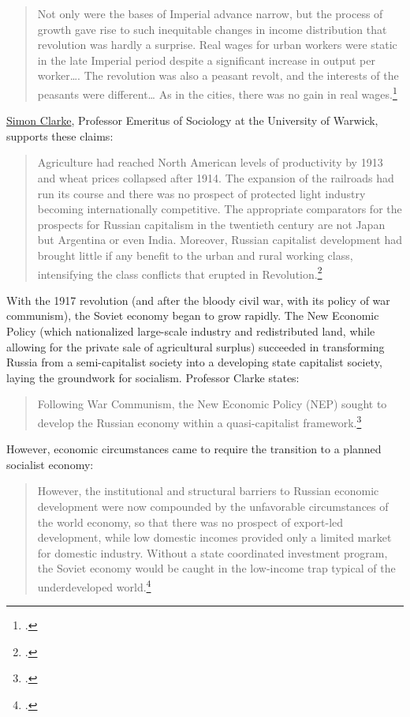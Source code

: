 \begin{quote}
Not only were the bases of Imperial advance narrow, but the process of
growth gave rise to such inequitable changes in income distribution that
revolution was hardly a surprise. Real wages for urban workers were
static in the late Imperial period despite a significant increase in
output per worker\ldots. The revolution was also a peasant revolt, and
the interests of the peasants were different\ldots{} As in the cities,
  there was no gain in real wages.\footcite{allen2003farm}
\end{quote}

\href{https://homepages.warwick.ac.uk/~syrbe/}{Simon Clarke}, Professor
Emeritus of Sociology at the University of Warwick, supports these
claims:

\begin{quote}
Agriculture had reached North American levels of productivity by 1913
and wheat prices collapsed after 1914. The expansion of the railroads
had run its course and there was no prospect of protected light industry
becoming internationally competitive. The appropriate comparators for
the prospects for Russian capitalism in the twentieth century are not
Japan but Argentina or even India. Moreover, Russian capitalist
development had brought little if any benefit to the urban and rural
working class, intensifying the class conflicts that erupted in
  Revolution.\footcite{clarke2005farm}
\end{quote}

With the 1917 revolution (and after the bloody civil war, with its
policy of war communism), the Soviet economy began to grow rapidly. The
New Economic Policy (which nationalized large-scale industry and
redistributed land, while allowing for the private sale of agricultural
surplus) succeeded in transforming Russia from a semi-capitalist society
into a developing state capitalist society, laying the groundwork for
socialism. Professor Clarke states:

\begin{quote}
Following War Communism, the New Economic Policy (NEP) sought to develop
  the Russian economy within a quasi-capitalist framework.\footcite{clarke2005farm}
\end{quote}

However, economic circumstances came to require the transition to a
planned socialist economy:

\begin{quote}
However, the institutional and structural barriers to Russian economic
development were now compounded by the unfavorable circumstances of the
world economy, so that there was no prospect of export-led development,
while low domestic incomes provided only a limited market for domestic
industry. Without a state coordinated investment program, the Soviet
economy would be caught in the low-income trap typical of the
  underdeveloped world.\footcite{clarke2005farm}
\end{quote}

